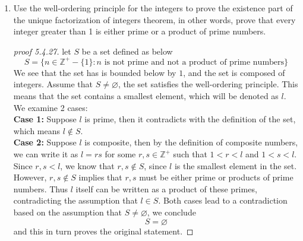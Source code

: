 \documentclass[12pt]{article}
\newcommand{\Z}{\mathbb{Z}}
\begin{document}
\begin{enumerate}
\begin{enumerate}
            \item[27.] Use the well-ordering principle for the integers to prove the existence part of the unique factorization of integers theorem, in other words, prove that every integer greater than 1 is either prime or a product of prime numbers. 
                \begin{proof}[proof 5.4.27]
                    let $S$ be a set defined as below
                    \[
                    S = \{ n \in \Z^+ - \{1\} : \text{$n$ is not prime and not a product of prime numbers}\}
                    \]
                    We see that the set has is bounded below by $1$, and the set is composed of integers. Assume that $S \neq \varnothing$, the set satisfies the well-ordering principle. This means that the set contains a smallest element, which will be denoted as $l$. We examine 2 cases:\\
                    \textbf{Case 1:} Suppose $l$ is prime, then it contradicts with the definition of the set, which means $l \notin S$.\\
                    \textbf{Case 2:} Suppose $l$ is composite, then by the definition of composite numbers, we can write it as $l = rs$ for some $r,s \in \Z^+$ such that $1 < r < l$ and $1 < s < l$. Since $r,s < l$, we know that $r,s \notin S$, since $l$ is the smallest element in the set. However, $r,s \notin S$ implies that $r,s$ must be either prime or products of prime numbers. Thus $l$ itself can be written as a product of these primes, contradicting the assumption that $l\in S$. Both cases lead to a contradiction based on the assumption that $S \neq \varnothing$, we conclude 
                    \[
                    S = \varnothing
                    \]
                    and this in turn proves the original statement. 
                \end{proof}
            
        \end{enumerate}
    \newpage


\end{enumerate}
\end{document}
